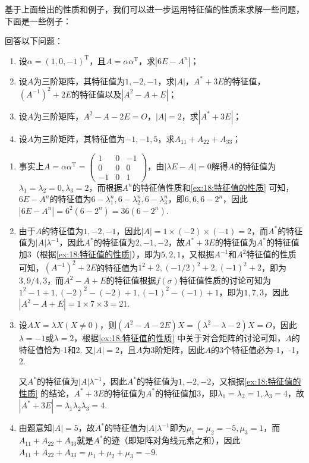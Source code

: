 基于上面给出的性质和例子，我们可以进一步运用特征值的性质来求解一些问题，下面是一些例子：
\begin{example}
    回答以下问题：
    \begin{enumerate}
        \item 设$\alpha=(1,0,-1)^\mathrm{T}$，且$A=\alpha\alpha^\mathrm{T}$，求$|6E-A^n|$；

        \item 设$A$为三阶矩阵，其特征值为$1,-2,-1$，求$|A|$，$A^*+3E$的特征值，$(A^{-1})^2+2E$的特征值以及$|A^2-A+E|$；

        \item 设$A$为三阶矩阵，$A^2-A-2E=O$，$|A|=2$，求$|A^*+3E|$；

        \item 设$A$为三阶矩阵，其特征值为$-1,-1,5$，求$A_{11}+A_{22}+A_{33}$；
    \end{enumerate}
\end{example}

\begin{solution}
    \begin{enumerate}
        \item 事实上$A=\alpha\alpha^\mathrm{T}=\begin{pmatrix}
                      1 & 0 & -1 \\ 0 & 0 & 0 \\ -1 & 0 & 1
                  \end{pmatrix}$，由$|\lambda E-A|=0$解得$A$的特征值为$\lambda_1=\lambda_2=0,\lambda_3=2$，而根据$A^n$的特征值性质和\autoref{ex:18:特征值的性质} 可知，$6E-A^n$的特征值为$6-\lambda_1^n,6-\lambda_2^n,6-\lambda_3^n$，即$6,6,6-2^n$，因此$|6E-A^n|=6^2(6-2^n)=36(6-2^n)$.

        \item 由于$A$的特征值为$1,-2,-1$，因此$|A|=1\times(-2)\times(-1)=2$，而$A^*$的特征值为$|A|\lambda^{-1}$，因此$A^*$的特征值为$2,-1,-2$，故$A^*+3E$的特征值为$A^*$的特征值加3（根据\autoref{ex:18:特征值的性质}），即为$5,2,1$，又根据$A^{-1}$和$A^2$特征值的性质可知，$(A^{-1})^2+2E$的特征值为$1^2+2,(-1/2)^2+2,(-1)^2+2$，即为$3,9/4,3$，而$A^2-A+E$的特征值根据$f(\sigma)$特征值性质的讨论可知为$1^2-1+1,(-2)^2-(-2)+1,(-1)^2-(-1)+1$，即为$1,7,3$，因此$|A^2-A+E|=1\times 7\times 3=21$.

        \item 设$AX=\lambda X(X\neq 0)$，则$(A^2-A-2E)X=(\lambda^2-\lambda-2)X=O$，因此$\lambda=-1$或$\lambda=2$，根据\autoref{ex:18:特征值的性质} 中关于对合矩阵的讨论可知，$A$的特征值恰为-1和2. 又$|A|=2$，且$A$为3阶矩阵，因此$A$的3个特征值必为-1，-1，2.

              又$A^*$的特征值为$|A|\lambda^{-1}$，因此$A^*$的特征值为$1,-2,-2$，又根据\autoref{ex:18:特征值的性质} 的结论，$A^*+3E$的特征值为$A^*$的特征值加3，即$\lambda_1=\lambda_2=1,\lambda_3=4$，故$|A^*+3E|=\lambda_1\lambda_2\lambda_3=4$.

        \item 由题意知$|A|=5$，故$A^*$的特征值为$|A|\lambda^{-1}$即为$\mu_1=\mu_2=-5,\mu_3=1$，而$A_{11}+A_{22}+A_{33}$就是$A^*$的迹（即矩阵对角线元素之和），因此$A_{11}+A_{22}+A_{33}=\mu_1+\mu_2+\mu_3=-9$.
    \end{enumerate}
\end{solution}

